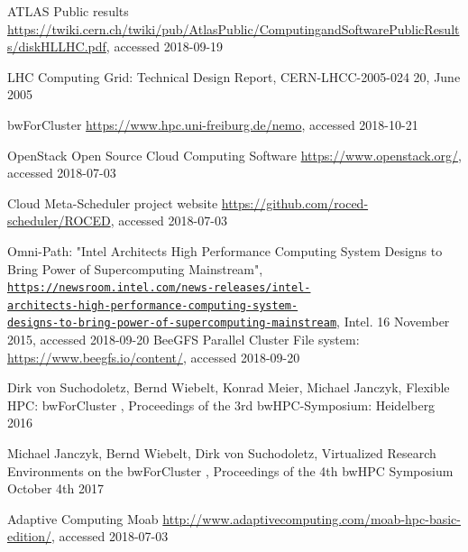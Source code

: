 \begin{thebibliography}{}
%
%
  ATLAS Public results
  \url{https://twiki.cern.ch/twiki/pub/AtlasPublic/ComputingandSoftwarePublicResults/diskHLLHC.pdf},
  accessed 2018-09-19

 LHC Computing Grid: Technical Design Report, 
  CERN-LHCC-2005-024 20, June 2005


 bwForCluster \NEMO \url{https://www.hpc.uni-freiburg.de/nemo}, accessed 2018-10-21
  
OpenStack Open Source Cloud Computing Software
\url{https://www.openstack.org/}, accessed 2018-07-03

\Roced Cloud Meta-Scheduler project website
\url{https://github.com/roced-scheduler/ROCED}, accessed 2018-07-03

  Omni-Path:
"Intel Architects High Performance Computing System Designs to Bring
Power of Supercomputing Mainstream",
\texttt{\href{https://newsroom.intel.com/news-releases/intel-architects-high-performance-computing-system-designs-to-bring-power-of-supercomputing-mainstream/}{https://newsroom.intel.com/news-releases/intel-\\architects-high-performance-computing-system-\\designs-to-bring-power-of-supercomputing-mainstream}},
Intel. 16 November 2015, accessed 2018-09-20
BeeGFS Parallel Cluster File system:
\url{https://www.beegfs.io/content/}, accessed 2018-09-20

Dirk von Suchodoletz, Bernd Wiebelt, Konrad Meier, Michael Janczyk,
  Flexible HPC: bwForCluster \NEMO,
  Proceedings of the 3rd bwHPC-Symposium: Heidelberg 2016

Michael Janczyk, Bernd Wiebelt, Dirk von Suchodoletz,
  Virtualized Research Environments on the bwForCluster \NEMO,
  Proceedings of the 4th bwHPC Symposium October 4th 2017



Adaptive Computing Moab
\url{http://www.adaptivecomputing.com/moab-hpc-basic-edition/}, accessed 2018-07-03


\end{thebibliography}
